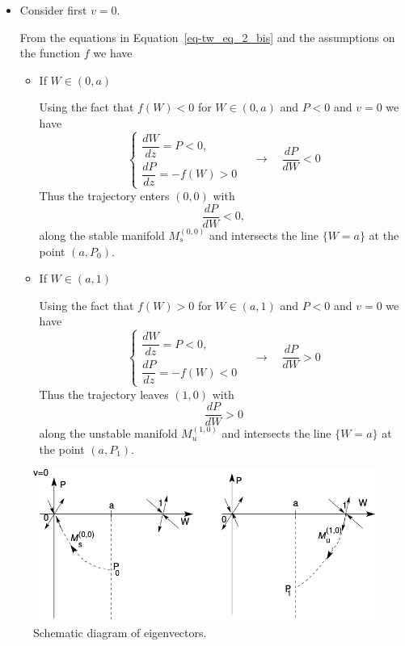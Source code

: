 \documentclass[
  letterpaper,
  DIV=11,
  numbers=noendperiod]{scrreprt}
\theoremstyle{plain}
\theoremstyle{definition}
\theoremstyle{plain}
\theoremstyle{remark}
\begin{document}
\begin{itemize}
\item
  Consider first \(v=0\).

  From the equations in Equation~\ref{eq-tw_eq_2_bis} and the
  assumptions on the function \(f\) we have

  \begin{itemize}
  \item
    If \(W \in (0,a)\)

    Using the fact that \(f(W) <0\) for \(W \in (0,a)\) and \(P<0\) and
    \(v=0\) we have \[        
      \begin{cases}
      \dfrac{dW}{dz} = P <0, \\
      \dfrac{dP}{dz} = - f(W) >0
      \end{cases}  \quad  \rightarrow \quad \dfrac{dP}{dW} <0
      \] Thus the trajectory enters \((0,0)\) with \[ 
    \dfrac{dP}{dW} <0,
    \] along the stable manifold \(\textit{M}_s^{(0,0)}\) and intersects
    the line \(\{ W=a\}\) at the point \((a, P_0)\).
  \item
    If \(W \in (a,1)\)

    Using the fact that \(f(W) >0\) for \(W \in (a,1)\) and \(P<0\) and
    \(v=0\) we have \[
      \begin{cases}
      \dfrac{dW}{dz} = P <0, \\
      \dfrac{dP}{dz} = - f(W) <0
      \end{cases}  \quad  \rightarrow \quad \dfrac{dP}{dW} >0
      \] Thus the trajectory leaves \((1,0)\) with \[
       \dfrac{dP}{dW} >0
      \] along the unstable manifold \(\textit{M}_u^{(1,0)}\) and
    intersects the line \(\{ W=a\}\) at the point \((a, P_1)\).
  \end{itemize}
\end{itemize}

\begin{figure}

{\centering \includegraphics{fig1.png}

}

\caption{\label{fig-shooting}Schematic diagram of eigenvectors.}

\end{figure}
\end{document}

